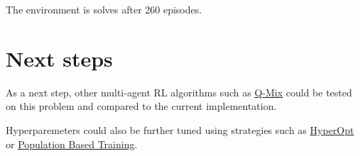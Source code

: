 \documentclass{article}
\begin{document}
    The environment is solves after 260 episodes.


    \section{Next steps}\label{sec:next-steps}

    As a next step, other multi-agent RL algorithms such as \href{http://proceedings.mlr.press/v80/rashid18a.html}{Q-Mix}
    could be tested on this problem and compared to the current implementation.

    Hyperparemeters could also be further tuned using strategies such as
    \href{https://github.com/hyperopt/hyperopt}{HyperOpt} or
    \href{https://deepmind.com/blog/article/population-based-training-neural-networks}{Population Based Training}.
\end{document}
